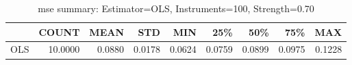 \begin{table}[ht]
\centering
\caption{mse summary: Estimator=OLS, Instruments=100, Strength=0.70}
\begin{tabular}{lrrrrrrrr}
\toprule
 & COUNT & MEAN & STD & MIN & 25\% & 50\% & 75\% & MAX \\
\midrule
OLS & 10.0000 & 0.0880 & 0.0178 & 0.0624 & 0.0759 & 0.0899 & 0.0975 & 0.1228 \\
\bottomrule
\end{tabular}
\end{table}
